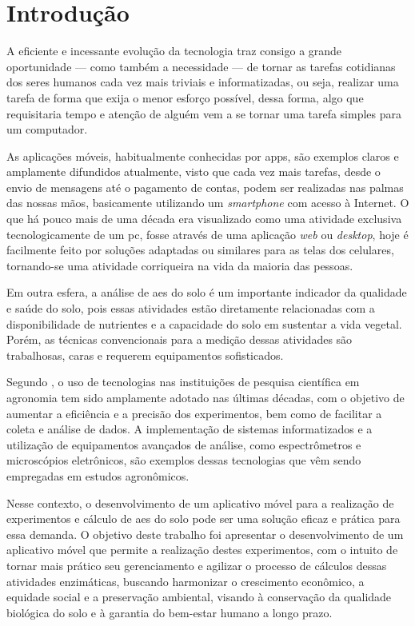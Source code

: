 \chapter{Introdução}
\label{chp:introduction}
A eficiente e incessante evolução da tecnologia traz consigo a grande oportunidade — como também a necessidade — de tornar as tarefas cotidianas dos seres humanos cada vez mais triviais e informatizadas, ou seja, realizar uma tarefa de forma que exija o menor esforço possível, dessa forma, algo que requisitaria tempo e atenção de alguém vem a se tornar uma tarefa simples para um computador.

As aplicações móveis, habitualmente conhecidas por \acp{app}, são exemplos claros e amplamente difundidos atualmente, visto que cada vez mais tarefas, desde o envio de mensagens até o pagamento de contas, podem ser realizadas nas palmas das nossas mãos, basicamente utilizando um \textit{smartphone} com acesso à Internet. O que há pouco mais de uma década era visualizado como uma atividade exclusiva tecnologicamente de um \ac{pc}, fosse através de uma aplicação \textit{web} ou \textit{desktop}, hoje é facilmente feito por soluções adaptadas ou similares para as telas dos celulares, tornando-se uma atividade corriqueira na vida da maioria das pessoas.

Em outra esfera, a análise de \acp{ae} do solo é um importante indicador da qualidade e saúde do solo, pois essas atividades estão diretamente relacionadas com a disponibilidade de nutrientes e a capacidade do solo em sustentar a vida vegetal. Porém, as técnicas convencionais para a medição dessas atividades são trabalhosas, caras e requerem equipamentos sofisticados.

Segundo \cite{nascimento2017impacto}, o uso de tecnologias nas instituições de pesquisa científica em agronomia tem sido amplamente adotado nas últimas décadas, com o objetivo de aumentar a eficiência e a precisão dos experimentos, bem como de facilitar a coleta e análise de dados. A implementação de sistemas informatizados e a utilização de equipamentos avançados de análise, como espectrômetros e microscópios eletrônicos, são exemplos dessas tecnologias que vêm sendo empregadas em estudos agronômicos.

Nesse contexto, o desenvolvimento de um aplicativo móvel para a realização de experimentos e cálculo de \acp{ae} do solo pode ser uma solução eficaz e prática para essa demanda. O objetivo deste trabalho foi apresentar o desenvolvimento de um aplicativo móvel que permite a realização destes experimentos, com o intuito de tornar mais prático seu gerenciamento e agilizar o processo de cálculos dessas atividades enzimáticas, buscando harmonizar o crescimento econômico, a equidade social e a preservação ambiental, visando à conservação da qualidade biológica do solo e à garantia do bem-estar humano a longo prazo.

